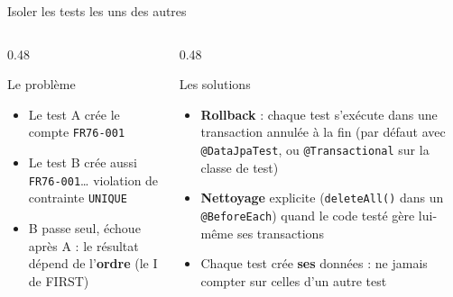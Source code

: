 \documentclass[aspectratio=169,10pt]{beamer}
\begin{document}
\begin{frame}{Isoler les tests les uns des autres}
  \begin{columns}[T]
    \begin{column}{0.48\textwidth}
      \begin{block}{Le problème}
        \begin{itemize}
          \item Le test A crée le compte \texttt{FR76-001}
          \item Le test B crée aussi \texttt{FR76-001}\ldots{} \alert{violation de contrainte \texttt{UNIQUE}}
          \item B passe seul, échoue après A : le résultat dépend de l'\textbf{ordre} (le I de FIRST)
        \end{itemize}
      \end{block}
    \end{column}
    \begin{column}{0.48\textwidth}
      \begin{block}{Les solutions}
        \begin{itemize}
          \item \textbf{Rollback} : chaque test s'exécute dans une transaction annulée à la fin (par défaut avec \texttt{@DataJpaTest}, ou \texttt{@Transactional} sur la classe de test)
          \item \textbf{Nettoyage} explicite (\texttt{deleteAll()} dans un \texttt{@BeforeEach}) quand le code testé gère lui-même ses transactions
          \item Chaque test crée \textbf{ses} données : ne jamais compter sur celles d'un autre test
        \end{itemize}
      \end{block}
    \end{column}
  \end{columns}
\end{frame}
\end{document}

